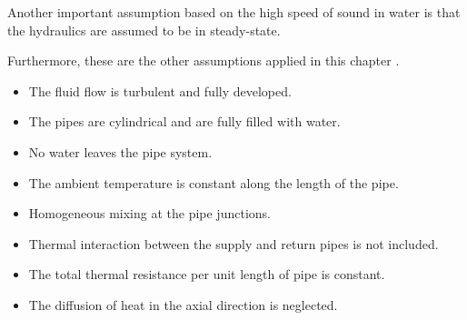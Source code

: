 Another important assumption based on the high speed of sound in water is that the hydraulics are assumed to be in steady-state. 

Furthermore, these are the other assumptions applied in this chapter \cite{MAURER2021244,sibeijn2025economic,KUNTUAROVA,PipePDE}.
\begin{itemize}
    \item The fluid flow is turbulent and fully developed.
    \item The pipes are cylindrical and are fully filled with water.
    \item No water leaves the pipe system.
    \item The ambient temperature is constant along the length of the pipe.
    \item Homogeneous mixing at the pipe junctions.
    \item Thermal interaction between the supply and return pipes is not included.
    \item The total thermal resistance per unit length of pipe is constant.
    \item The diffusion of heat in the axial direction is neglected. 
\end{itemize}


